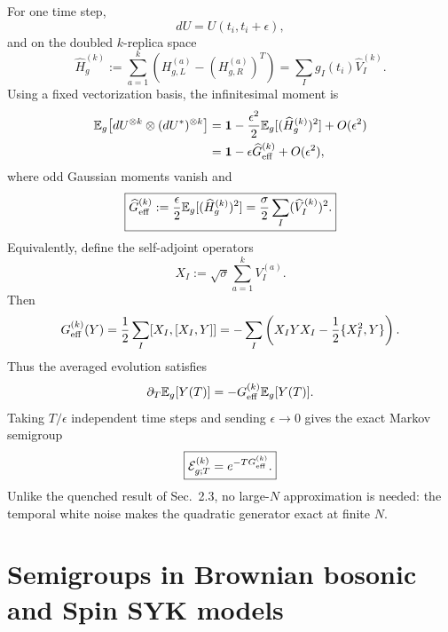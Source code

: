 \documentclass{article}
\theoremstyle{definition}
\begin{document}
For one time step,
\begin{equation}
    dU=U(t_i,t_i+\epsilon),
\end{equation}
and on the doubled $k$-replica space
\begin{equation}
    \widehat H_g^{(k)}
    :=\sum_{a=1}^k
    \left(H_{g,L}^{(a)}-(H_{g,R}^{(a)})^T\right)
    =\sum_Ig_I(t_i)\widehat V_I^{(k)}.
\end{equation}
Using a fixed vectorization basis, the infinitesimal moment is
\begin{align}
    \mathbb E_g\!\left[dU^{\otimes k}\otimes(dU^*)^{\otimes k}\right]
    &={\bf 1}
      -\frac{\epsilon^2}{2}
       \mathbb E_g[(\widehat H_g^{(k)})^2]
      +O(\epsilon^2)
    \nonumber\\
    &={\bf 1}-\epsilon\widehat G_{\rm eff}^{(k)}+O(\epsilon^2),
\end{align}
where odd Gaussian moments vanish and
\begin{equation}
    \boxed{
    \widehat G_{\rm eff}^{(k)}
    :=\frac{\epsilon}{2}
      \mathbb E_g[(\widehat H_g^{(k)})^2]
    =\frac{\sigma}{2}\sum_I(\widehat V_I^{(k)})^2.
    }
\end{equation}
Equivalently, define the self-adjoint operators
\begin{equation}
    X_I:=\sqrt\sigma\sum_{a=1}^kV_I^{(a)}.
\end{equation}
Then
\begin{equation}
    G_{\rm eff}^{(k)}(Y)
    =\frac12\sum_I[X_I,[X_I,Y]]
    =-\sum_I
      \left(X_IYX_I-\frac12\{X_I^2,Y\}\right).
\end{equation}
Thus the averaged evolution satisfies
\begin{equation}
    \partial_T\mathbb E_g[Y(T)]
    =-G_{\rm eff}^{(k)}\mathbb E_g[Y(T)].
\end{equation}
Taking $T/\epsilon$ independent time steps and sending $\epsilon\to0$ gives
the exact Markov semigroup
\begin{equation}
    \boxed{
    {\cal E}_{g;T}^{(k)}=e^{-TG_{\rm eff}^{(k)}}.
    }
\end{equation}
Unlike the quenched result of Sec.~2.3, no large-$N$ approximation is
needed: the temporal white noise makes the quadratic generator exact at
finite $N$.


\section{Semigroups in Brownian bosonic and Spin SYK models}
\label{sec:brownian_spin_syk}
\end{document}
